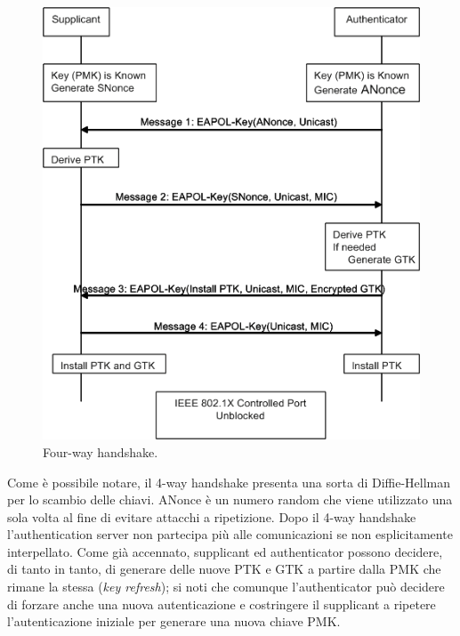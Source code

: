 \begin{figure}[htbp]
	\centering
	\includegraphics[scale = 0.4]{images/four-way-handshake}
	\caption{Four-way handshake.}
	\label{img:four-way-handshake}
\end{figure}

Come è possibile notare, il 4-way handshake presenta una sorta di Diffie-Hellman per lo scambio delle chiavi. ANonce è un numero random che viene utilizzato una sola volta al fine di evitare attacchi a ripetizione. Dopo il 4-way handshake l'authentication server non partecipa più alle comunicazioni se non esplicitamente interpellato. Come già accennato, supplicant ed authenticator possono decidere, di tanto in tanto, di generare delle nuove PTK e GTK a partire dalla PMK che rimane la stessa (\textit{key refresh}); si noti che comunque l'authenticator può decidere di forzare anche una nuova autenticazione e costringere il supplicant a ripetere l'autenticazione iniziale per generare una nuova chiave PMK. \\

